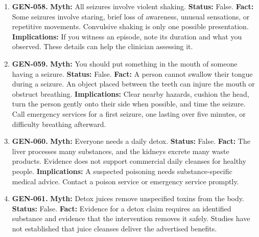 \documentclass[11pt,oneside]{book}
\begin{document}
\begin{enumerate}[leftmargin=0pt,labelwidth=0pt,labelsep=0pt,itemindent=0pt]
\textbf{Status:} False.\newline
\textbf{Fact:} Dementia describes a syndrome. Alzheimer's disease is one cause. Others include vascular disease and Lewy body disease, and causes can coexist. \cite{ref189}\newline
\textbf{Implications:} A clinical assessment can help clarify the cause and guide care.
\item[] \textbf{GEN-058.} \textbf{Myth:} All seizures involve violent shaking.\newline
\textbf{Status:} False.\newline
\textbf{Fact:} Some seizures involve staring, brief loss of awareness, unusual sensations, or repetitive movements. Convulsive shaking is only one possible presentation. \cite{ref71}\newline
\textbf{Implications:} If you witness an episode, note its duration and what you observed. These details can help the clinician assessing it.
\item[] \textbf{GEN-059.} \textbf{Myth:} You should put something in the mouth of someone having a seizure.\newline
\textbf{Status:} False.\newline
\textbf{Fact:} A person cannot swallow their tongue during a seizure. An object placed between the teeth can injure the mouth or obstruct breathing. \cite{ref302}\newline
\textbf{Implications:} Clear nearby hazards, cushion the head, turn the person gently onto their side when possible, and time the seizure. Call emergency services for a first seizure, one lasting over five minutes, or difficulty breathing afterward.
\item[] \textbf{GEN-060.} \textbf{Myth:} Everyone needs a daily detox.\newline
\textbf{Status:} False.\newline
\textbf{Fact:} The liver processes many substances, and the kidneys excrete many waste products. Evidence does not support commercial daily cleanses for healthy people. \cite{ref303}\newline
\textbf{Implications:} A suspected poisoning needs substance-specific medical advice. Contact a poison service or emergency service promptly.
\item[] \textbf{GEN-061.} \textbf{Myth:} Detox juices remove unspecified toxins from the body.\newline
\textbf{Status:} False.\newline
\textbf{Fact:} Evidence for a detox claim requires an identified substance and evidence that the intervention removes it safely. Studies have not established that juice cleanses deliver the advertised benefits. \cite{ref303}\newline

\end{enumerate}
\end{document}
